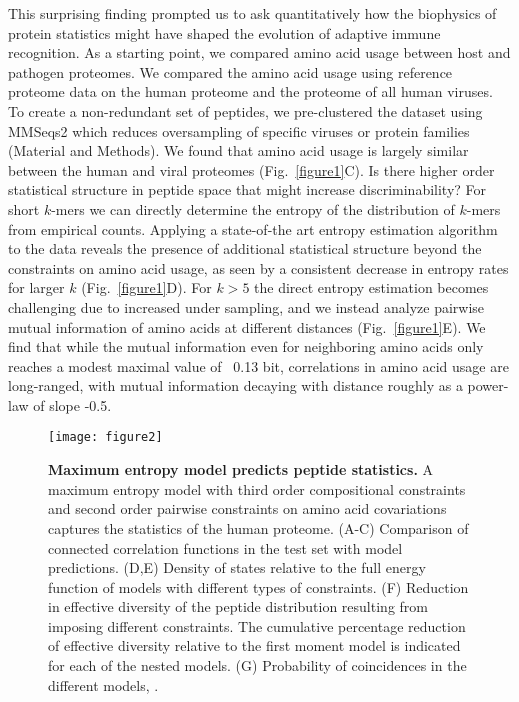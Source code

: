 \documentclass[superscriptaddress,twocolumn,pre]{revtex4}
\newcommand{\<}{\langle}
\renewcommand{\>}{\rangle}
\begin{document}
This surprising finding prompted us to ask quantitatively how the biophysics of protein statistics might have shaped the evolution of adaptive immune recognition. As a starting point, we compared amino acid usage between host and pathogen proteomes. We compared the amino acid usage using reference proteome data on the human proteome and the proteome of all human viruses. To create a non-redundant set of peptides, we pre-clustered the dataset using MMSeqs2 which reduces oversampling of specific viruses or protein families (Material and Methods). We found that amino acid usage is largely similar between the human and viral proteomes (Fig.~\ref{figure1}C). Is there higher order statistical structure in peptide space that might increase discriminability? For short $k$-mers we can directly determine the entropy of the distribution of $k$-mers from empirical counts. Applying a state-of-the art entropy estimation algorithm to the data reveals the presence of additional statistical structure beyond the constraints on amino acid usage, as seen by a consistent decrease in entropy rates for larger $k$ (Fig.~\ref{figure1}D). For $k>5$ the direct entropy estimation becomes challenging due to increased under sampling, and we instead analyze pairwise mutual information of amino acids at different distances (Fig.~\ref{figure1}E). We find that while the mutual information even for neighboring amino acids only reaches a modest maximal value of ~0.13 bit, correlations in amino acid usage are long-ranged, with mutual information decaying with distance roughly as a power-law of slope -0.5.

 \begin{figure*}
    \texttt{[image: figure2]}
        \caption{{\bf Maximum entropy model predicts peptide statistics.}
        A maximum entropy model with third order compositional constraints and second order pairwise constraints on amino acid covariations captures the statistics of the human proteome. (A-C) Comparison of connected correlation functions in the test set with model predictions. (D,E) Density of states relative to the full energy function of models with different types of constraints. (F) Reduction in effective diversity of the peptide distribution resulting from imposing different constraints. The cumulative percentage reduction of effective diversity relative to the first moment model is indicated for each of the nested models. (G) Probability of coincidences in the different models, .
    \label{figure2}
    }
 \end{figure*}
\end{document}
